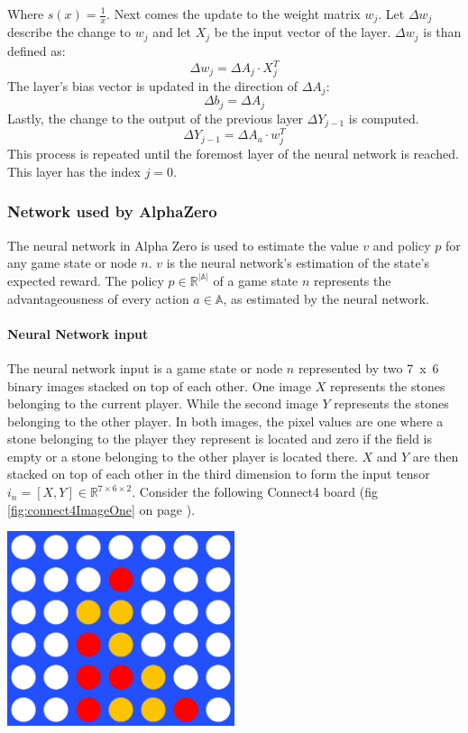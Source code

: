 \documentclass[12pt]{article}
\newcommand{\imgRef}[1]{(fig \ref{#1} on page \pageref{#1})}
\begin{document}
Where \(s(x) = \frac{1}{x}\).
Next comes the update to the weight matrix \(w_j\). Let \(\Delta w_j\) describe the change to \(w_j\) and let \(X_j\) be the input vector of the layer. \(\Delta w_j\) is than defined as:
\begin{equation}\label{eq:NN:deltaW}
\Delta w_j = \Delta A_j \cdot X_j^T
\end{equation}
The layer's bias vector is updated in the direction of \(\Delta A_j\):
\begin{equation}\label{eq:NN:deltaB}
\Delta b_j = \Delta A_j
\end{equation}
Lastly, the change to the output of the previous layer \(\Delta Y_{j-1}\) is computed.
\begin{equation} \label{eq:NN:deltaA_lastLayer}
\Delta Y_{j-1} = \Delta A_a \cdot w_j^T
\end{equation}
This process is repeated until the foremost layer of the neural network is reached. This layer has the index \(j=0\).

\subsubsection{Network used by AlphaZero}
The neural network in Alpha Zero is used to estimate the value \(v\) and policy \(p\) for any game state or node \(n\). \(v\) is the neural network's estimation of the state's expected reward. The policy \(p \in\mathbb{R}^{|\mathbb{A}|}\) of a game state \(n\) represents the advantageousness of every action \(a\in\mathbb{A}\), as estimated by the neural network.
\paragraph{Neural Network input}\label{sec:neuralNetworkInput}
The neural network input is a game state or node \(n\) represented by two \mbox{7 x 6} binary images stacked on top of each other. One image \(X\) represents the stones belonging to the current player. While the second image \(Y\) represents the stones belonging to the other player. In both images, the pixel values are one where a stone belonging to the player they represent is located and zero if the field is empty or a stone belonging to the other player is located there. \(X\) and \(Y\) are then stacked on top of each other in the third dimension to form the input tensor \(i_n = [X, Y] \in \mathbb{R}^{7 \times 6 \times 2}\).
Consider the following Connect4 board \imgRef{fig:connect4ImageOne}.

\begin{center}
\includegraphics[width=0.5\textwidth]{connectFourExample}
\label{fig:connect4ImageOne}
\end{center}
\end{document}
